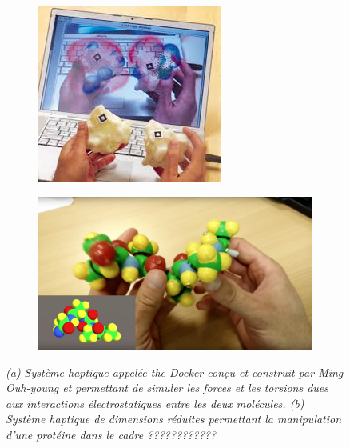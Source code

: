 \begin{figure}[h]
  \begin{subfigure}{.5\textwidth}
  \centering
  {\includegraphics[width=0.9\linewidth]{./figures/ch2/tangible_marker}}
    \caption{}
    \label{Fig:tangible_marker}
  \end{subfigure}
  \begin{subfigure}{.4\textwidth}
  \centering
  {\includegraphics[width=0.7\linewidth]{./figures/ch2/tangible_xav}}
    \caption{}
    \label{Fig:tangible_xav}
  \hspace{0.3cm}
  \end{subfigure}
  \caption{\it (a) Système haptique appelée \textit{the Docker} conçu et construit par Ming Ouh-young et permettant de simuler les forces et les torsions dues aux interactions électrostatiques entre les deux molécules.
  (b) Système haptique de dimensions réduites permettant la manipulation d'une protéine dans le cadre ????????????
  }
\end{figure}


